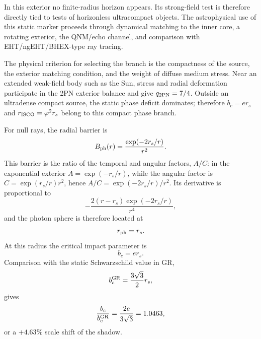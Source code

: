 \documentclass[12pt]{article}
\begin{document}
In this exterior no finite-radius horizon appears. Its strong-field test is therefore directly tied to tests of horizonless ultracompact objects. The astrophysical use of this static marker proceeds through dynamical matching to the inner core, a rotating exterior, the QNM/echo channel, and comparison with EHT/ngEHT/BHEX-type ray tracing.

The physical criterion for selecting the branch is the compactness of the source, the exterior matching condition, and the weight of diffuse medium stress. Near an extended weak-field body such as the Sun, stress and radial deformation participate in the 2PN exterior balance and give $q_{\rm 2PN}=7/4$. Outside an ultradense compact source, the static phase deficit dominates; therefore $b_c=e r_s$ and $r_{\rm ISCO}=\varphi^2 r_s$ belong to this compact phase branch.

For null rays, the radial barrier is
\begin{equation}
B_{\rm ph}(r)=\frac{\exp(-2r_s/r)}{r^2}.
\end{equation}
This barrier is the ratio of the temporal and angular factors, $A/C$: in the exponential exterior $A=\exp(-r_s/r)$, while the angular factor is $C=\exp(r_s/r)r^2$, hence $A/C=\exp(-2r_s/r)/r^2$.
Its derivative is proportional to
\begin{equation}
-\frac{2(r-r_s)\exp(-2r_s/r)}{r^4},
\end{equation}
and the photon sphere is therefore located at
\begin{equation}
r_{\rm ph}=r_s .
\end{equation}
At this radius the critical impact parameter is
\begin{equation}
b_c=e r_s .
\end{equation}
Comparison with the static Schwarzschild value in GR,
\begin{equation}
b_c^{\rm GR}=\frac{3\sqrt3}{2}r_s,
\end{equation}
gives
\begin{equation}
\frac{b_c}{b_c^{\rm GR}}=\frac{2e}{3\sqrt3}=1.0463,
\end{equation}
or a $+4.63\%$ scale shift of the shadow.
\end{document}
